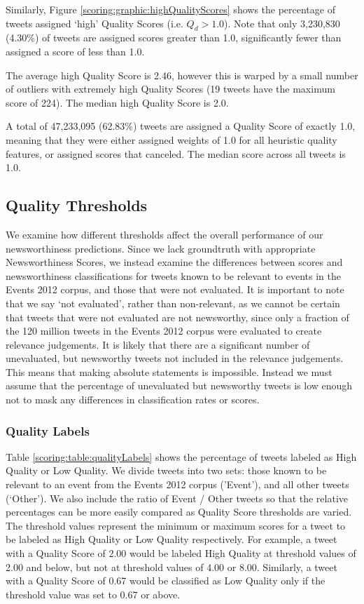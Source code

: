 Similarly, Figure \ref{scoring:graphic:highQualityScores} shows the percentage of tweets assigned `high' Quality Scores (i.e. \(Q_d > 1.0\)).
Note that only 3,230,830 (4.30\%) of tweets are assigned scores greater than 1.0, significantly fewer than assigned a score of less than 1.0.

The average high Quality Score is 2.46, however this is warped by a small number of outliers with extremely high Quality Scores (19 tweets have the maximum score of 224).
The median high Quality Score is 2.0.

A total of 47,233,095 (62.83\%) tweets are assigned a Quality Score of exactly 1.0, meaning that they were either assigned weights of 1.0 for all heuristic quality features, or assigned scores that canceled.
The median score across all tweets is 1.0.

\subsection{Quality Thresholds}
We examine how different thresholds affect the overall performance of our newsworthiness predictions.
Since we lack groundtruth with appropriate Newsworthiness Scores, we instead examine the differences between scores and newsworthiness classifications for tweets known to be relevant to events in the Events 2012 corpus, and those that were not evaluated.
It is important to note that we say `not evaluated', rather than non-relevant, as  we cannot be certain that tweets that were not evaluated are not newsworthy, since only a fraction of the 120 million tweets in the Events 2012 corpus were evaluated to create relevance judgements.
It is likely that there are a significant number of unevaluated, but newsworthy tweets not included in the relevance judgements.
This means that making absolute statements is impossible.
Instead we must assume that the percentage of unevaluated but newsworthy tweets is low enough not to mask any differences in classification rates or scores.

\subsubsection{Quality Labels}

Table \ref{scoring:table:qualityLabels} shows the percentage of tweets labeled as High Quality or Low Quality. We divide tweets into two sets: those known to be relevant to an event from the Events 2012 corpus ('Event'), and all other tweets (`Other').
We also include the ratio of Event / Other tweets so that the relative percentages can be more easily compared as Quality Score thresholds are varied.
The threshold values represent the minimum or maximum scores for a tweet to be labeled as High Quality or Low Quality respectively.
For example, a tweet with a Quality Score of 2.00 would be labeled High Quality at threshold values of 2.00 and below, but not at threshold values of 4.00 or 8.00.
Similarly, a tweet with a Quality Score of 0.67 would be classified as Low Quality only if the threshold value was set to 0.67 or above.

